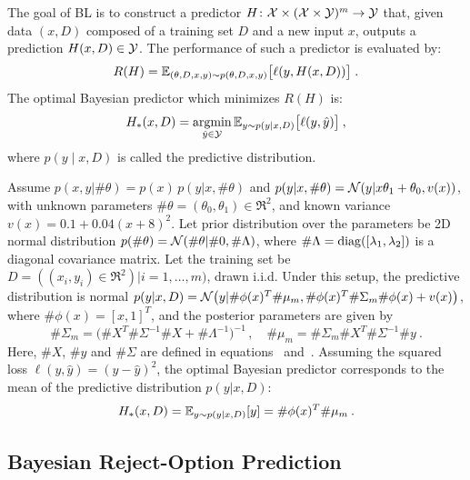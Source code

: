 The goal of BL is to construct a predictor $H \colon {\cal X} \times ({\cal X} \times {\cal Y})^m \rightarrow {\cal Y}$ that, given data $(x,D)$ composed of a training set $D$ and a new input $x$, outputs a prediction $H(x, D) \in {\cal Y}$. The performance of such a predictor is evaluated by:
\begin{multline}
\label{equ:BayesLearnExpRisk}
R(H) = 
 {\mathbb{E}}_{(\theta,D,x,y)\sim p(\theta,D,x,y)} \big[\ell(y, H(x, D))\big]\;.
\end{multline}
%
The optimal Bayesian predictor which minimizes $R(H)$ is:
\begin{equation}
\label{equ:BLOptBayes}
H_*(x, D) = \mathop{\rm argmin}_{\hat{y} \in {\cal Y}} {\mathbb{E}}_{y\sim p(y|x,D)}\big [ \ell(y, \hat{y}) \big ] \:,
\end{equation}
%
where $p(y\mid x,D)$ is called the predictive distribution. 


\begin{example}
\label{example:BLregression}Assume $p(x,y|\#\theta)=p(x)\,p(y|x,\#\theta)$
and $p(y|x,\#\theta)={\cal N}(y|x\theta_1+\theta_0,v(x))$, with unknown parameters $\#\theta=(\theta_0,\theta_1)\in\Re^2$, and known variance $v(x)=0.1+0.04(x+8)^2$. Let prior distribution over the parameters be 2D normal distribution $p(\#\theta)={\cal N}(\#\theta|\#0,\#\Lambda)$, where $\#\Lambda={\rm diag}([\lambda_1,\lambda_2])$ is a diagonal covariance matrix. Let the training set be $D=((x_i,y_i)\in\Re^2)|i=1,\ldots,m)$, drawn i.i.d.  
%
Under this setup, the predictive distribution is normal $p(y|x,D)={\cal N}\big(y|\#\phi(x)^T\#\mu_m,\#\phi(x)^T\#\Sigma_m\#\phi(x)+v(x)\big)$, where $\#\phi(x)=[x,1]^T$, and the posterior parameters are given by
\[
\#\Sigma_m=\big(\#X^T\#\Sigma^{-1}\#X+\#\Lambda^{-1} )^{-1}\,,\quad \#\mu_m=\#\Sigma_m\#X^T\#\Sigma^{-1}\#y \:.
\]
Here, $\#X$, $\#y$ and $\#\Sigma$ are defined in equations~ and~.
Assuming the squared loss $\ell(y,\hat{y})=(y-\hat{y})^2$, the optimal Bayesian predictor corresponds to the mean of the predictive distribution $p(y|x,D)$:
\begin{equation}
\label{equ:BLpredLinReg}
   H_*(x,D) = {\mathbb{E}}_{y\sim p(y|x,D)}[y]=\#\phi(x)^T\#\mu_m \:.
\end{equation}
\end{example}



\subsection{Bayesian Reject-Option Prediction}

